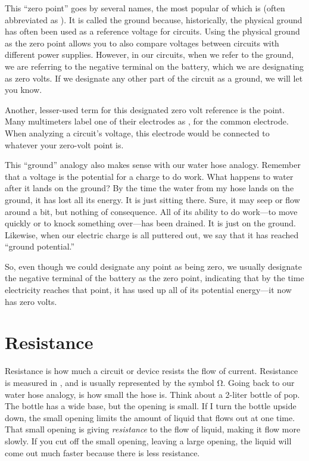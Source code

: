 This ``zero point'' goes by several names, the most popular of which is  (often abbreviated as ).
It is called the ground because, historically, the physical ground has often been used as a reference voltage for circuits.
Using the physical ground as the zero point allows you to also compare voltages between circuits with different power supplies.
However, in our circuits, when we refer to the ground, we are referring to the negative terminal on the battery, which we are designating as zero volts.
If we designate any other part of the circuit as a ground, we will let you know.  %

Another, lesser-used term for this designated zero volt reference is the  point.
Many multimeters label one of their electrodes as , for the common electrode.
When analyzing a circuit's voltage, this electrode would be connected to whatever your zero-volt point is.

This ``ground'' analogy also makes sense with our water hose analogy.
Remember that a voltage is the potential for a charge to do work.
What happens to water after it lands on the ground?
By the time the water from my hose lands on the ground, it has lost all its energy.
It is just sitting there.
Sure, it may seep or flow around a bit, but nothing of consequence.
All of its ability to do work---to move quickly or to knock something over---has been drained.
It is just on the ground.
Likewise, when our electric charge is all puttered out, we say that it has reached ``ground potential.''

So, even though we could designate any point as being zero, we usually designate the negative terminal of the battery as the zero point, indicating that by the time electricity reaches that point, it has used up all of its potential energy---it now has zero volts.

\section{Resistance}

Resistance is how much a circuit or device resists the flow of current.
Resistance is measured in , and is usually represented by the symbol \si{\ohm}.
Going back to our water hose analogy,  is how small the hose is.
Think about a 2-liter bottle of pop.
The bottle has a wide base, but the opening is small.
If I turn the bottle upside down, the small opening limits the amount of liquid that flows out at one time.
That small opening is giving \emph{resistance} to the flow of liquid, making it flow more slowly.
If you cut off the small opening, leaving a large opening, the liquid will come out much faster because there is less resistance.

